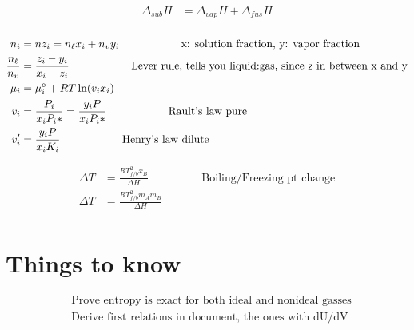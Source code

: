 \documentclass[10pt]{article} %
\begin{document}
\begin{align*}
  \Delta_{sub} H &= \Delta_{vap} H + \Delta_{fus} H\\
\end{align*}

\begin{align*}
  n_i &= nz_i = n_{\ell}x_i + n_{v}y_i\hspace{2cm}\mbox{x: solution fraction, y: vapor fraction}\\
  \frac{n_\ell}{n_v} &= \frac{z_i - y_i}{x_i - z_i}\hspace{2cm}\mbox{Lever rule, tells you liquid:gas, since z in between x and y}\\
  \mu_i &= \mu_i\degree + RT\ln(v_ix_i)\\
  v_i &= \frac{P_i}{x_iP_i*} = \frac{y_iP}{x_iP_i*}\hspace{2cm}\mbox{Rault's law pure}\\
  v_i' &= \frac{y_iP}{x_iK_i}\hspace{2cm}\mbox{Henry's law dilute}\\
\end{align*}

\begin{align*}
  \Delta T &= \frac{RT^2_{f/b}x_B}{\Delta H}\hspace{2cm}\mbox{Boiling/Freezing pt change}\\
  \Delta T &= \frac{RT^2_{f/b}m_Am_B}{\Delta H}\\
\end{align*}

\section{Things to know}
\begin{align*}
  &\mbox{Prove entropy is exact for both ideal and nonideal gasses}\\
  &\mbox{Derive first relations in document, the ones with dU/dV}\\
\end{align*}
\end{document}
